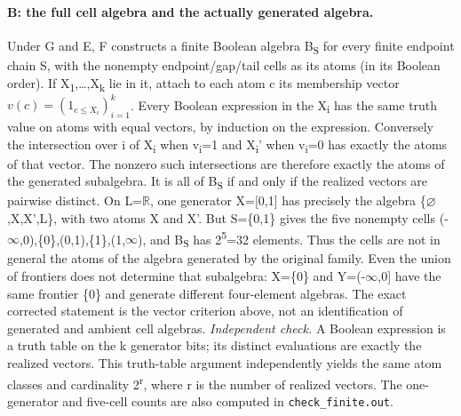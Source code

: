 \paragraph{B: the full cell algebra and the actually generated algebra.}\label{lem:generated}
Under G and E, F constructs a finite Boolean algebra B\textsubscript{S} for every finite endpoint chain S, with the nonempty endpoint/gap/tail cells as its atoms (in its Boolean order). If X\textsubscript{1},\ldots,X\textsubscript{k} lie in it, attach to each atom c its membership vector $v(c)=(1_{c\leq X_i})_{i=1}^k$. Every Boolean expression in the X\textsubscript{i} has the same truth value on atoms with equal vectors, by induction on the expression. Conversely the intersection over i of X\textsubscript{i} when v\textsubscript{i}=1 and X\textsubscript{i}' when v\textsubscript{i}=0 has exactly the atoms of that vector. The nonzero such intersections are therefore exactly the atoms of the generated subalgebra. It is all of B\textsubscript{S} if and only if the realized vectors are pairwise distinct.
On L=$\mathbb R$, one generator X=[0,1] has precisely the algebra \{$\varnothing$,X,X',L\}, with two atoms X and X'. But S=\{0,1\} gives the five nonempty cells (-$\infty$,0),\{0\},(0,1),\{1\},(1,$\infty$), and B\textsubscript{S} has 2\textsuperscript{5}=32 elements. Thus the cells are not in general the atoms of the algebra generated by the original family. Even the union of frontiers does not determine that subalgebra: X=\{0\} and Y=(-$\infty$,0] have the same frontier \{0\} and generate different four-element algebras. The exact corrected statement is the vector criterion above, not an identification of generated and ambient cell algebras.
\emph{Independent check.} A Boolean expression is a truth table on the k generator bits; its distinct evaluations are exactly the realized vectors. This truth-table argument independently yields the same atom classes and cardinality 2\textsuperscript{r}, where r is the number of realized vectors. The one-generator and five-cell counts are also computed in \texttt{check\_finite.out}.

